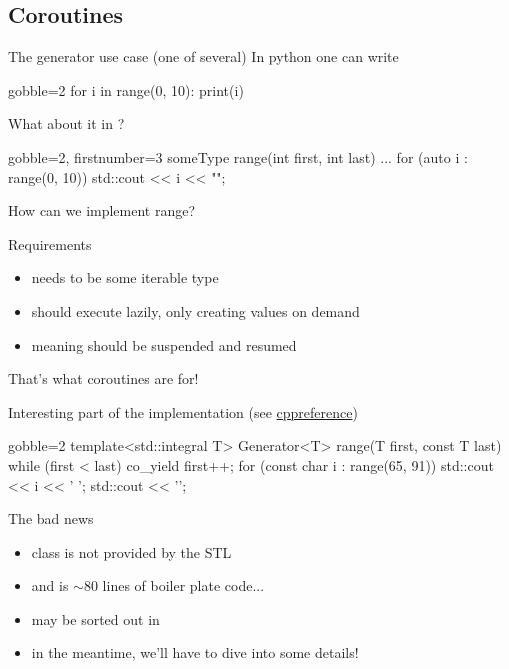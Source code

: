 \subsection{Coroutines}

\begin{frame}[fragile]
  \begin{block}{The generator use case (one of several)}
    In python one can write
    {\scriptsize
      \begin{pythoncode*}{gobble=2}
        for i in range(0, 10):
          print(i)
      \end{pythoncode*}
    }
    What about it in \cpp?
    {\scriptsize
      \begin{cppcode*}{gobble=2, firstnumber=3}
        someType range(int first, int last) { ... }
        for (auto i : range(0, 10)) {
          std::cout << i << "\n";
        }
      \end{cppcode*}
    }
    How can we implement range?
  \end{block}
  \begin{exampleblock}{Requirements}
    \begin{itemize}
    \item {} needs to be some iterable type
    \item {} should execute lazily, only creating values on demand
    \item meaning  should be suspended and resumed
    \end{itemize}
    That's what coroutines are for!
  \end{exampleblock}
\end{frame}

\begin{frame}[fragile]
  \begin{exampleblock}{Interesting part of the implementation (see \href{https://en.cppreference.com/w/cpp/coroutine/coroutine\_handle\#Example}{\color{blue!50!white}cppreference})}
    {\scriptsize
      \begin{cppcode*}{gobble=2}
        template<std::integral T>
        Generator<T> range(T first, const T last) {
          while (first < last) {
            co_yield first++;
          }
        }
        for (const char i : range(65, 91)) {
          std::cout << i << ' ';
        }
        std::cout << '\n';
      \end{cppcode*}
    }
  \end{exampleblock}
  \begin{alertblock}{The bad news}
    \begin{itemize}
    \item class  is not provided by the STL
    \item and is $\sim80$ lines of boiler plate code...
    \item may be sorted out in 
    \item in the meantime, we'll have to dive into some details!
    \end{itemize}
  \end{alertblock}
\end{frame}

